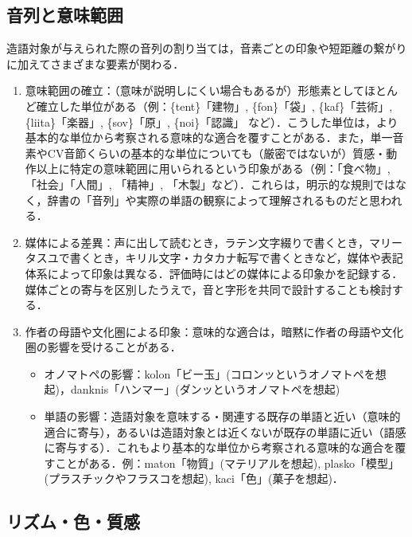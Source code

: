 \documentclass[../../main-detail.tex]{subfiles}
\begin{document}
\subsection{音列と意味範囲}
造語対象が与えられた際の音列の割り当ては，音素ごとの印象や短距離の繋がりに加えてさまざまな要素が関わる．
\begin{enumerate}
    \item 意味範囲の確立：（意味が説明しにくい場合もあるが）形態素としてほとんど確立した単位がある（例：\{tent\}「建物」, \{fon\}「袋」, \{kaf\}「芸術」, \{liita\}「楽器」, \{sov\}「原」, \{noi\}「認識」 など）．こうした単位は，より基本的な単位から考察される意味的な適合を覆すことがある．また，単一音素やCV音節くらいの基本的な単位についても（厳密ではないが）質感・動作以上に特定の意味範囲に用いられるという印象がある（例：「食べ物」, 「社会」「人間」, 「精神」, 「木製」など）．これらは，明示的な規則ではなく，辞書の「音列」や実際の単語の観察によって理解されるものだと思われる．
    \item 媒体による差異：声に出して読むとき，ラテン文字綴りで書くとき，マリータスユで書くとき，キリル文字・カタカナ転写で書くときなど，媒体や表記体系によって印象は異なる．評価時にはどの媒体による印象かを記録する．媒体ごとの寄与を区別したうえで，音と字形を共同で設計することも検討する．
    \item 作者の母語や文化圏による印象：意味的な適合は，暗黙に作者の母語や文化圏の影響を受けることがある．
    \begin{itemize}
        \item オノマトペの影響：kolon「ビー玉」(コロンッというオノマトペを想起)，danknis「ハンマー」(ダンッというオノマトペを想起)
        \item 単語の影響：造語対象を意味する・関連する既存の単語と近い（意味的適合に寄与），あるいは造語対象とは近くないが既存の単語に近い（語感に寄与する）．これもより基本的な単位から考察される意味的な適合を覆すことがある．例：maton「物質」(マテリアルを想起), plasko「模型」(プラスチックやフラスコを想起), kaci「色」(菓子を想起)．
    \end{itemize}
\end{enumerate}

\subsection{リズム・色・質感}
\end{document}
